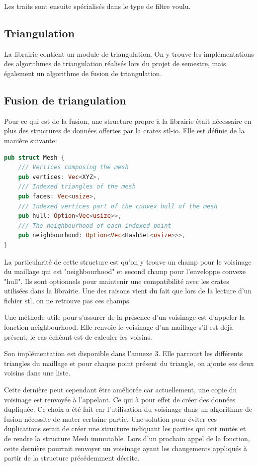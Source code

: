 Les traits sont ensuite spécialisés dans le type de filtre voulu.
\subsection{Triangulation}
La librairie contient un module de triangulation.
On y trouve les implémentations des algorithmes de triangulation réalisés lors du projet de semestre, mais également un algorithme de  fusion de triangulation.

\subsection{Fusion de triangulation}
Pour ce qui est de la fusion, une structure propre à la librairie était nécessaire en plus des structures de données offertes par la crates stl-io.
Elle est définie de la manière suivante:
\begin{lstlisting}[language=Rust, style=boxed]
pub struct Mesh {
    /// Vertices composing the mesh
    pub vertices: Vec<XYZ>,
    /// Indexed triangles of the mesh
    pub faces: Vec<usize>,
    /// Indexed vertices part of the convex hull of the mesh
    pub hull: Option<Vec<usize>>,
    /// The neighbourhood of each indexed point
    pub neighbourhood: Option<Vec<HashSet<usize>>>,
}
\end{lstlisting}

La particularité de cette structure est qu'on y trouve un champ pour le voisinage du maillage qui est "neighbourhood" et second champ pour l'enveloppe convexe "hull".
Ils sont optionnels pour maintenir une compatibilité avec les crates utilisées dans la librairie.
Une des raisons vient du fait que lors de la lecture d'un fichier \gls{stl}, on ne retrouve pas ces champs. 

Une méthode utile pour s'assurer de la présence d'un voisinage est d'appeler la fonction neighbourhood.
Elle renvoie le voisinage d'un maillage s'il est déjà présent, le cas échéant est de calculer les voisins.

Son implémentation est disponible dans l'annexe 3. 
Elle parcourt les différents triangles du maillage et pour chaque point présent du triangle, on ajoute ses deux voisins dans une liste.

Cette dernière peut cependant
être améliorée car actuellement, une copie du voisinage est renvoyée à
l'appelant. Ce qui à pour effet de créer des données dupliquée. Ce choix a été
fait car l'utilisation du voisinage dans un algorithme de fusion nécessite de
muter certaine partie. Une solution pour éviter ces duplications serait de créer
une structure indiquant les parties qui ont mutés et de rendre la structure Mesh
immutable. Lors d'un prochain appel de la fonction, cette dernière pourrait
renvoyer un voisinage ayant les changements appliqués à partir de la structure
précédemment décrite.  

